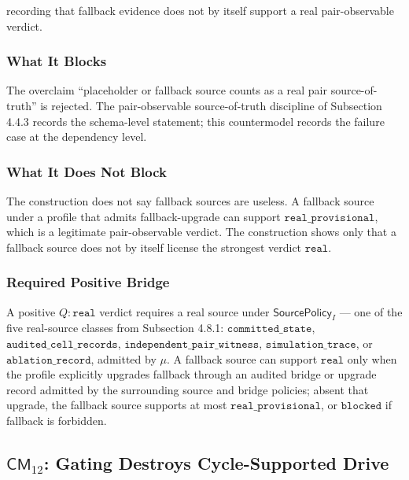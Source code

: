\documentclass[11pt]{article}
\theoremstyle{definition}
\begin{document}
recording that fallback evidence does not by itself support a real pair-observable verdict.

\subsubsection{What It Blocks}

The overclaim ``placeholder or fallback source counts as a real pair source-of-truth'' is rejected. The pair-observable source-of-truth discipline of Subsection 4.4.3 records the schema-level statement; this countermodel records the failure case at the dependency level.

\subsubsection{What It Does Not Block}

The construction does not say fallback sources are useless. A fallback source under a profile that admits fallback-upgrade can support \(\texttt{real\_provisional}\), which is a legitimate pair-observable verdict. The construction shows only that a fallback source does not by itself license the strongest verdict \(\texttt{real}\).

\subsubsection{Required Positive Bridge}

A positive \(Q:\texttt{real}\) verdict requires a real source under \(\mathsf{SourcePolicy}_I\) --- one of the five real-source classes from Subsection 4.8.1: \(\texttt{committed\_state}\), \(\texttt{audited\_cell\_records}\), \(\texttt{independent\_pair\_witness}\), \(\texttt{simulation\_trace}\), or \(\texttt{ablation\_record}\), admitted by \(\mu\). A fallback source can support \(\texttt{real}\) only when the profile explicitly upgrades fallback through an audited bridge or upgrade record admitted by the surrounding source and bridge policies; absent that upgrade, the fallback source supports at most \(\texttt{real\_provisional}\), or \(\texttt{blocked}\) if fallback is forbidden.

\subsection{\texorpdfstring{\(\mathsf{CM}_{12}\): Gating Destroys Cycle-Supported Drive}{C.13 \textbackslash mathsf\{CM\}\_\{12\}: Gating Destroys Cycle-Supported Drive}}
\end{document}
